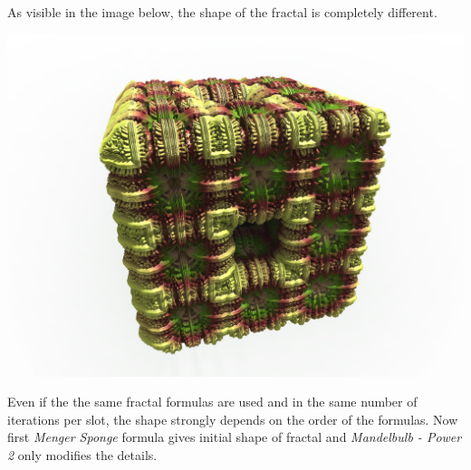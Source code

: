 As visible in the image below, the shape of the fractal is completely different.\nopagebreak

\includegraphics[width=0.7\linewidth]{img/manual/media/hybrid_sequence_example_5.png}

Even if the the same fractal formulas are used and in the same number of iterations per slot, the shape strongly depends on the order of the formulas.
Now first \emph{Menger Sponge} formula gives initial shape of fractal and \emph{Mandelbulb - Power 2} only modifies the details.
